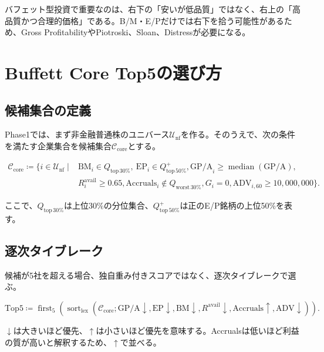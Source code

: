 \documentclass[11pt,a4paper]{article}
\newcommand{\GPA}{\mathrm{GP/A}}
\newcommand{\Acc}{\mathrm{Accruals}}
\newcommand{\ADV}{\mathrm{ADV}}
\DeclareMathOperator{\first}{first}
\DeclareMathOperator{\sort}{sort}
\begin{document}
バフェット型投資で重要なのは、右下の「安いが低品質」ではなく、右上の「高品質かつ合理的価格」である。B/M・E/Pだけでは右下を拾う可能性があるため、Gross ProfitabilityやPiotroski、Sloan、Distressが必要になる。

\clearpage
\section{Buffett Core Top5の選び方}

\subsection{候補集合の定義}

Phase1では、まず非金融普通株のユニバース$\mathcal{U}_{\mathrm{nf}}$を作る。そのうえで、次の条件を満たす企業集合を候補集合$\mathcal{C}_{\mathrm{core}}$とする。

\begin{align}
\mathcal{C}_{\mathrm{core}} \coloneqq \{ i\in\mathcal{U}_{\mathrm{nf}} \mid{}&
\mathrm{BM}_i \in Q_{\mathrm{top}\,30\%},\
\mathrm{EP}_i \in Q^{+}_{\mathrm{top}\,50\%},
\GPA_i \ge \operatorname{median}(\GPA),
\nonumber\\
& R^{\mathrm{avail}}_i \ge 0.65,
\Acc_i \notin Q_{\mathrm{worst}\,30\%},
G_i=0,
\ADV_{i,60}\ge 10{,}000{,}000
\}.
\label{eq:core-candidates}
\end{align}

ここで、$Q_{\mathrm{top}\,30\%}$は上位30\%の分位集合、$Q^{+}_{\mathrm{top}\,50\%}$は正のE/P銘柄の上位50\%を表す。

\subsection{逐次タイブレーク}

候補が5社を超える場合、独自重み付きスコアではなく、逐次タイブレークで選ぶ。

\begin{equation}
\mathrm{Top5} \coloneqq \first_5\!\left(
\sort_{\mathrm{lex}}\left(
\mathcal{C}_{\mathrm{core}};
\GPA\downarrow,
\mathrm{EP}\downarrow,
\mathrm{BM}\downarrow,
R^{\mathrm{avail}}\downarrow,
\Acc\uparrow,
\ADV\downarrow
\right)
\right).
\label{eq:top5}
\end{equation}

$\downarrow$は大きいほど優先、$\uparrow$は小さいほど優先を意味する。Accrualsは低いほど利益の質が高いと解釈するため、$\uparrow$で並べる。
\end{document}
